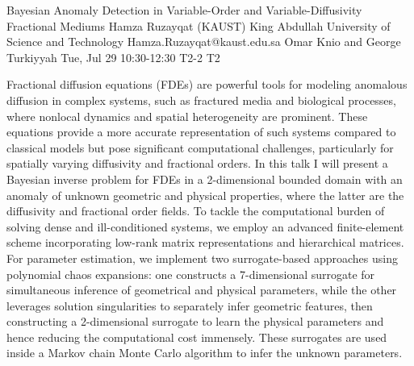 \begin{talk}
  {Bayesian Anomaly Detection in Variable-Order and Variable-Diffusivity Fractional Mediums}%
  {Hamza Ruzayqat}%
  {(KAUST) King Abdullah University of Science and Technology}%
  {Hamza.Ruzayqat@kaust.edu.sa}%
  {Omar Knio and George Turkiyyah}%
  {}%
  {Tue, Jul 29 10:30-12:30}%
  {T2-2}%
  {T2}%
  
				
			
Fractional diffusion equations (FDEs) are powerful tools for modeling anomalous diffusion in complex systems, such as fractured media and biological processes, where nonlocal dynamics and spatial heterogeneity are prominent. These equations provide a more accurate representation of such systems compared to classical models but pose significant computational challenges, particularly for spatially varying diffusivity and fractional orders. In this talk I will present a Bayesian inverse problem for FDEs in a 2-dimensional bounded domain with an anomaly of unknown geometric and physical properties, where the latter are the diffusivity and fractional order fields. To tackle the computational burden of solving dense and ill-conditioned systems, we employ an advanced finite-element scheme incorporating low-rank matrix representations and hierarchical matrices. For parameter estimation, we implement two surrogate-based approaches using polynomial chaos expansions: one constructs a 7-dimensional surrogate for simultaneous inference of geometrical and physical parameters, while the other leverages solution singularities to separately infer geometric features, then constructing a 2-dimensional surrogate to learn the physical parameters and hence reducing the computational cost immensely. These surrogates are used inside a Markov chain Monte Carlo algorithm to infer the unknown parameters.

\medskip

\end{talk}

